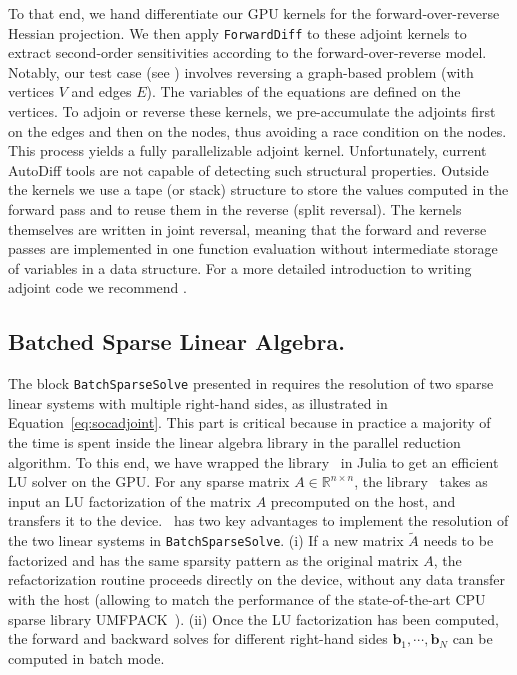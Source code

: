 To that end, we hand differentiate our GPU kernels for the
forward-over-reverse Hessian projection. We then apply
\lstinline{ForwardDiff} to these adjoint kernels to extract second-order
sensitivities according to the forward-over-reverse model.
Notably, our test case (see ) involves reversing a
graph-based problem (with vertices $V$ and edges $E$). The variables of the
equations are defined on the vertices. To adjoin or reverse these kernels, we
pre-accumulate the adjoints first on the edges and then on the nodes, thus
avoiding a race condition on the nodes. This process yields a fully
parallelizable adjoint kernel. Unfortunately, current AutoDiff tools are not
capable of detecting such structural properties. Outside the kernels we use a
tape (or stack) structure to store the values computed in the forward pass
and to reuse them in the reverse (split reversal). The kernels themselves are
written in joint reversal, meaning that the forward and reverse passes are
implemented in one function evaluation without intermediate storage of
variables in a data structure. For a more detailed introduction to writing
adjoint code we recommend \cite{griewank2008evaluating}.

\subsection{Batched Sparse Linear Algebra.}
\label{sec:implementation:linearalgebra}

The block {\tt BatchSparseSolve} presented in 
requires the resolution of two sparse linear systems with multiple right-hand sides,
as illustrated in Equation~\eqref{eq:socadjoint}.
This part is critical because in practice a majority of the time
is spent inside the linear algebra library in the parallel reduction algorithm.
To this end, we have wrapped the library
\cusolverrf\ in Julia to get an efficient LU solver on the GPU.
For any sparse matrix $A \in \mathbb{R}^{n \times n}$,
the library \cusolverrf\ takes as input an LU factorization of the matrix $A$ precomputed on the host,
and transfers it to the device. \cusolverrf\ has two key advantages to implement
the resolution of the two linear systems in {\tt BatchSparseSolve}.
(i) If a new matrix $\tilde A$ needs to be factorized and has the same
sparsity pattern as the original matrix $A$, the refactorization routine
proceeds directly on the device, without any data transfer with the host
(allowing to match the performance of the state-of-the-art CPU sparse library UMFPACK~\cite{davis2004algorithm}).
(ii) Once the LU factorization has been computed, the forward and backward solves
for different right-hand  sides $\bm{b}_1, \cdots, \bm{b}_N$ can be computed in batch mode.

